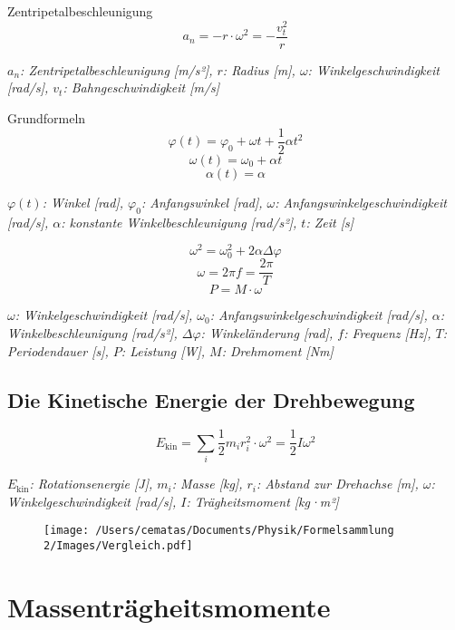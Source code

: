 \documentclass[a5paper,10pt]{article}
\newenvironment{displayformula}
{
	\begin{framed}
		\color{formulaColor}
	}
	{\end{framed}}
\newcommand{\formulalegend}[1]{%
	\par\vspace{0.5ex}%
	{{\color{legendColor}\RaggedRight\small\textit{#1}}}%
	\par\vspace{1.5ex}%
}
\begin{document}
\begin{displayformula}
	Zentripetalbeschleunigung
	\[
	a_n = -r \cdot \omega^2 = - \frac{v_t^2}{r}
	\]
\end{displayformula}
\formulalegend{
	\( a_n \): Zentripetalbeschleunigung [m/s²], \( r \): Radius [m], \( \omega \): Winkelgeschwindigkeit [rad/s], \( v_t \): Bahngeschwindigkeit [m/s]
}

\begin{displayformula}
	Grundformeln
	\[
	\varphi (t) = \varphi_0 + \omega t + \frac{1}{2} \alpha t^2
	\]
	\[
	\omega (t) = \omega_0 + \alpha t
	\]
	\[
	\alpha (t) = \alpha
	\]
\end{displayformula}
\formulalegend{
	\( \varphi(t) \): Winkel [rad], \( \varphi_0 \): Anfangswinkel [rad], \( \omega \): Anfangswinkelgeschwindigkeit [rad/s], \( \alpha \): konstante Winkelbeschleunigung [rad/s²], \( t \): Zeit [s]
}
\newpage
\begin{displayformula}
	\[
	\omega^2 = \omega_0^2 + 2\alpha \Delta\varphi
	\]
	\[
	\omega = 2\pi f = \frac{2\pi}{T}
	\]
	\[
	P = M \cdot \omega
	\]
\end{displayformula}
\formulalegend{
	\( \omega \): Winkelgeschwindigkeit [rad/s], \( \omega_0 \): Anfangswinkelgeschwindigkeit [rad/s], \( \alpha \): Winkelbeschleunigung [rad/s²], \( \Delta \varphi \): Winkeländerung [rad], \( f \): Frequenz [Hz], \( T \): Periodendauer [s], \( P \): Leistung [W], \( M \): Drehmoment [Nm]
}

\subsection{Die Kinetische Energie der Drehbewegung}

\begin{displayformula}
	\[
	E_{\text{kin}} = \sum_i \frac{1}{2} m_i r_i^2 \cdot \omega^2 = \frac{1}{2} I \omega^2
	\]
\end{displayformula}
\formulalegend{
	\( E_{\text{kin}} \): Rotationsenergie [J], \( m_i \): Masse [kg], \( r_i \): Abstand zur Drehachse [m], \( \omega \): Winkelgeschwindigkeit [rad/s], \( I \): Trägheitsmoment [kg·m²]
}
\newpage
\begin{figure}[h]
	\centering
	\texttt{[image: /Users/cematas/Documents/Physik/Formelsammlung 2/Images/Vergleich.pdf]}
	\label{fig:beispiel}
\end{figure}
\newpage
\section{Massenträgheitsmomente}
\end{document}
